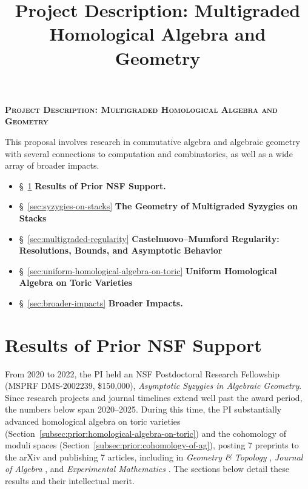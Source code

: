 \documentclass[11pt,reqno]{amsart}
\title{Project Description: Multigraded Homological Algebra and Geometry}
\theoremstyle{remark}
\begin{document}
 
\thispagestyle{empty}
\pagestyle{empty}
\begingroup  
  \centering
  \large\scshape\bfseries Project Description: Multigraded Homological Algebra and Geometry\\[1em]
\endgroup


\setcounter{section}{0}

\noindent This proposal involves research in commutative algebra and algebraic geometry with several connections to computation and combinatorics, as well as a wide array of broader impacts.
\begin{itemize}[leftmargin=*]
	\item \S~\ref{sec:prior-work} \textbf{Results of Prior NSF Support.} 
	\item \S~\ref{sec:syzygies-on-stacks} \textbf{The Geometry of Multigraded Syzygies on Stacks}
	\item \S~\ref{sec:multigraded-regularity} \textbf{Castelnuovo–Mumford Regularity: Resolutions, Bounds, and Asymptotic Behavior}
	\item \S~\ref{sec:uniform-homological-algebra-on-toric} \textbf{Uniform Homological Algebra on Toric Varieties}
	\item \S~\ref{sec:broader-impacts} \textbf{Broader Impacts.}
\end{itemize}

\section{Results of Prior NSF Support}\label{sec:prior-work}

From 2020 to 2022, the PI held an NSF Postdoctoral Research Fellowship (MSPRF DMS-2002239, \$150,000), \textit{Asymptotic Syzygies in Algebraic Geometry}. Since research projects and journal timelines extend well past the award period, the numbers below span 2020--2025. During this time, the PI substantially advanced homological algebra on toric varieties (Section~\ref{subsec:prior:homological-algebra-on-toric}) and the cohomology of moduli spaces (Section~\ref{subsec:prior:cohomology-of-ag}), posting 7 preprints to the arXiv \cite{BCEGLY22,bruceHellerSayrafi26,bruceHellerSayrafi22,brandtBruceCorey23,BBCMMW24,ABBCV25,bruceHellerSayrafiSeceleanu25} and publishing 7 articles, including in \textit{Geometry \& Topology} \cite{BBCMMW24}, \textit{Journal of Algebra} \cite{BCEGLY22}, and \textit{Experimental Mathematics} \cite{BEGY20}. The sections below detail these results and their intellectual merit.
\end{document}
